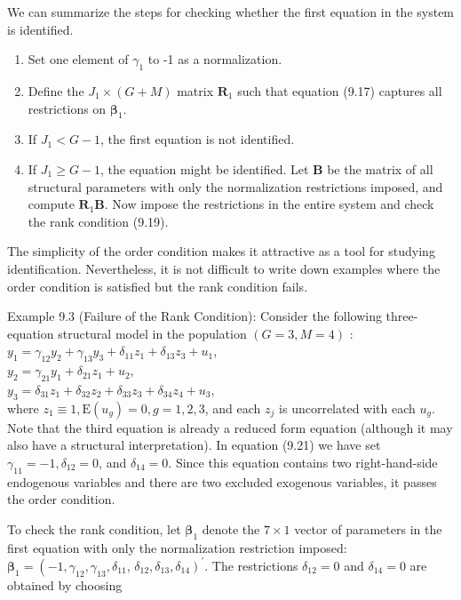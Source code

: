 \documentclass[10pt]{article}
\begin{document}
We can summarize the steps for checking whether the first equation in the system is identified.

\begin{enumerate}
  \item Set one element of $\gamma_{1}$ to -1 as a normalization.
  \item Define the $J_{1} \times(G+M)$ matrix $\mathbf{R}_{1}$ such that equation (9.17) captures all restrictions on $\boldsymbol{\beta}_{1}$.
  \item If $J_{1}<G-1$, the first equation is not identified.
  \item If $J_{1} \geq G-1$, the equation might be identified. Let $\mathbf{B}$ be the matrix of all structural parameters with only the normalization restrictions imposed, and compute $\mathbf{R}_{1} \mathbf{B}$. Now impose the restrictions in the entire system and check the rank condition (9.19).
\end{enumerate}

The simplicity of the order condition makes it attractive as a tool for studying identification. Nevertheless, it is not difficult to write down examples where the order condition is satisfied but the rank condition fails.

Example 9.3 (Failure of the Rank Condition): Consider the following three-equation structural model in the population $(G=3, M=4)$ :\\
$y_{1}=\gamma_{12} y_{2}+\gamma_{13} y_{3}+\delta_{11} z_{1}+\delta_{13} z_{3}+u_{1}$,\\
$y_{2}=\gamma_{21} y_{1}+\delta_{21} z_{1}+u_{2}$,\\
$y_{3}=\delta_{31} z_{1}+\delta_{32} z_{2}+\delta_{33} z_{3}+\delta_{34} z_{4}+u_{3}$,\\
where $z_{1} \equiv 1, \mathrm{E}\left(u_{g}\right)=0, g=1,2,3$, and each $z_{j}$ is uncorrelated with each $u_{g}$. Note that the third equation is already a reduced form equation (although it may also have a structural interpretation). In equation (9.21) we have set $\gamma_{11}=-1, \delta_{12}=0$, and $\delta_{14}=0$. Since this equation contains two right-hand-side endogenous variables and there are two excluded exogenous variables, it passes the order condition.

To check the rank condition, let $\boldsymbol{\beta}_{1}$ denote the $7 \times 1$ vector of parameters in the first equation with only the normalization restriction imposed: $\boldsymbol{\beta}_{1}=\left(-1, \gamma_{12}, \gamma_{13}, \delta_{11}\right.$, $\left.\delta_{12}, \delta_{13}, \delta_{14}\right)^{\prime}$. The restrictions $\delta_{12}=0$ and $\delta_{14}=0$ are obtained by choosing
\end{document}
